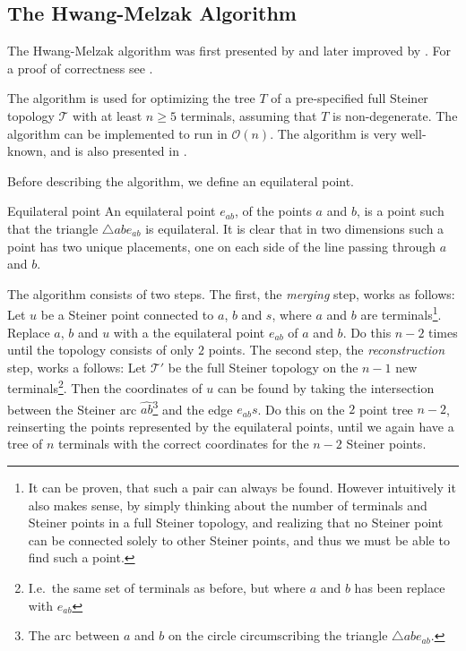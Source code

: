 \subsection{The Hwang-Melzak Algorithm}
\label{sec:hwang-melz-algor}

The Hwang-Melzak algorithm was first presented by \textcite{melzak1961} and
later improved by \textcite{hwang1986hexagonal}. For a proof of correctness see
\textcite{hwang1986linear, melzak1961}.

The algorithm is used for optimizing the tree $T$ of a pre-specified full
Steiner topology $\mathcal{T}$ with at least $n \ge 5$ terminals, assuming that
$T$ is non-degenerate. The algorithm can be implemented to run in
$\mathcal{O}(n)$. The algorithm is very well-known, and is also presented in
\textcite{brazil2015,smith1992}.

Before describing the algorithm, we define an equilateral point.
%
\begin{definition}{Equilateral point}
  An equilateral point $e_{ab}$, of the points $a$ and $b$, is a point such that the
  triangle $\triangle a b e_{ab}$ is equilateral. It is clear that in two dimensions
  such a point has two unique placements, one on each side of the line passing
  through $a$ and $b$.
\end{definition}
%
The algorithm consists of two steps. The first, the \textit{merging} step, works
as follows: Let $u$ be a Steiner point connected to $a$, $b$ and $s$, where $a$
and $b$ are terminals\footnote{It can be proven, that such a pair can always be
found. However intuitively it also makes sense, by simply thinking about the
number of terminals and Steiner points in a full Steiner topology, and realizing
that no Steiner point can be connected solely to other Steiner points, and thus
we must be able to find such a point.}. Replace $a$, $b$ and $u$ with a the
equilateral point $e_{ab}$ of $a$ and $b$. Do this $n-2$ times until the
topology consists of only $2$ points. The second step, the
\textit{reconstruction} step, works a follows: Let $\mathcal{T}'$ be the full
Steiner topology on the $n-1$ new terminals\footnote{I.e.\ the same set of
  terminals as before, but where $a$ and $b$ has been replace with
  $e_{ab}$}. Then the coordinates of $u$ can be found by taking the intersection
between the Steiner arc $\widehat{ab}$\footnote{The arc between $a$ and $b$ on the
  circle circumscribing the triangle $\triangle a b e_{ab}$.} and the edge
$e_{ab}s$. Do this on the $2$ point tree $n-2$, reinserting the points
represented by the equilateral points, until we again have a tree of $n$
terminals with the correct coordinates for the $n-2$ Steiner points.

